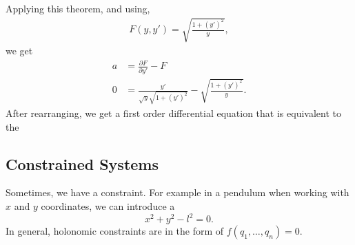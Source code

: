 \documentclass{article}
\numberwithin{equation}{section}
\begin{document}
Applying this theorem, and using,
\begin{align*}
    F(y,y') = \sqrt{\frac{1+(y')^2}{y}},
\end{align*}
we get 
\begin{align*}
    a &= \frac{\partial F}{\partial y'} - F \\ 
    0 &= \frac{y'}{\sqrt{y}\sqrt{1+(y')^2}} - \sqrt{\frac{1+(y')^2}{y}}.
\end{align*}
After rearranging, we get a first order differential equation that is equivalent to the 
\subsection{Constrained Systems}
Sometimes, we have a constraint. For example in a pendulum when working with $x$ and $y$ coordinates, we can introduce a 
\begin{equation}
    x^2+y^2-l^2=0.
\end{equation}
In general, holonomic constraints are in the form of $f(q_1,\dots,q_n)=0.$
\end{document}
